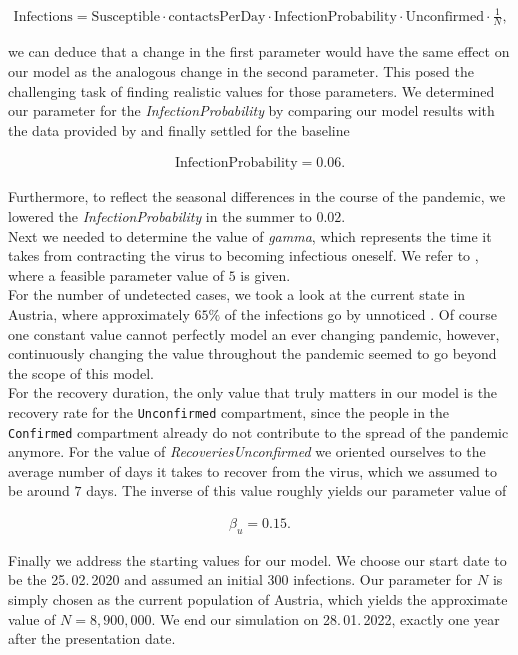 \documentclass
[
    report,
    11pt,
    bibliography = totoc,
    listof = totoc,
    headinclude = true,
]
{scrreport}
\begin{document}
\begin{align*}
  \text{Infections} = \text{Susceptible} \cdot \text{contactsPerDay} \cdot
  \text{InfectionProbability} \cdot
  \text{Unconfirmed} \cdot \frac{1}{N},
\end{align*}

we can deduce that a change in the first parameter would have the same effect on our model
as the analogous change in the second parameter.
This posed the challenging task of finding realistic values for those parameters.
We determined our parameter for the \textit{InfectionProbability} by comparing
our model results with the data provided by \cite{OrfCorona} and finally
settled for the baseline

\begin{align*}
  \text{InfectionProbability} = 0.06.
\end{align*}

Furthermore, to reflect the seasonal differences in the course of the pandemic,
we lowered the \textit{InfectionProbability} in the summer to $0.02$. \\
Next we needed to determine the value of \textit{gamma}, which represents the time
it takes from contracting the virus to becoming infectious oneself.
We refer to \cite{RobertKochInstitut}, where a feasible parameter value of $5$ is given. \\
For the number of undetected cases, we took a look at the current state in Austria,
where approximately $65\%$ of the infections go by unnoticed \cite{MassTests}.
Of course one constant value cannot perfectly model an ever changing pandemic, however, continuously changing the value throughout the pandemic seemed to go beyond the scope of this model. \\
For the recovery duration, the only value that truly matters in our model
is the recovery rate for the \texttt{Unconfirmed} compartment, since the people in the
\texttt{Confirmed} compartment already do not contribute to the spread of the pandemic anymore.
For the value of \textit{RecoveriesUnconfirmed} we oriented ourselves to the average number of days
it takes to recover from the virus, which we assumed to be around $7$ days.
The inverse of this value roughly yields our parameter value of

\begin{align*}
  \beta_u = 0.15.
\end{align*}

Finally we address the starting values for our model. We choose our start date
to be the 25.\,02.\,2020 and assumed an initial 300 infections.
Our parameter for $N$ is simply chosen as the current population of Austria,
which yields the approximate value of $N = 8,900,000$.
We end our simulation on 28.\,01.\,2022, exactly one year after the presentation date.
\end{document}
